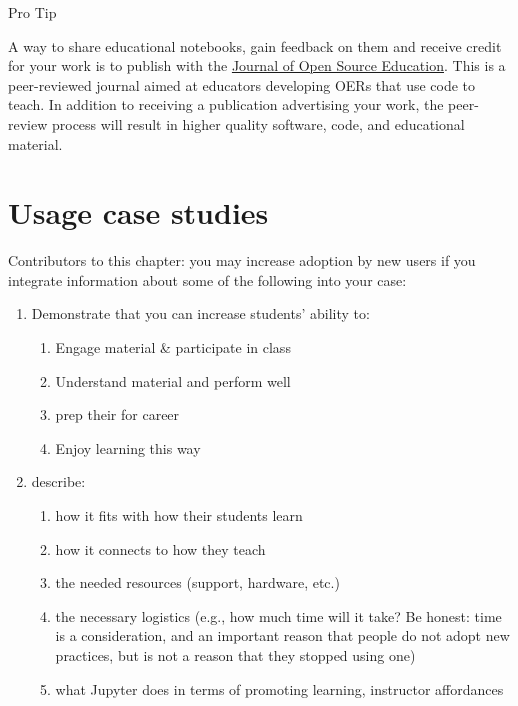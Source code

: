\documentclass[]{book}
\providecommand{\tightlist}{%
  \setlength{\itemsep}{0pt}\setlength{\parskip}{0pt}}
\let\BeginKnitrBlock\begin \let\EndKnitrBlock\end
\begin{document}
\BeginKnitrBlock{rmdnote}
Pro Tip

A way to share educational notebooks, gain feedback on them and receive
credit for your work is to publish with the
\href{http://jose.theoj.org}{Journal of Open Source Education}. This is a
peer-reviewed journal aimed at educators developing OERs that use code to
teach. In addition to receiving a publication advertising your work, the
peer-review process will result in higher quality software, code, and
educational material.
\EndKnitrBlock{rmdnote}

\hypertarget{case-studies}{%
\chapter{Usage case studies}\label{case-studies}}

Contributors to this chapter: you may increase adoption by new users
if you integrate information about some of the following into your
case:

\begin{enumerate}
\def\labelenumi{\arabic{enumi}.}
\tightlist
\item
  Demonstrate that you can increase students' ability to:

  \begin{enumerate}
  \def\labelenumii{\arabic{enumii}.}
  \tightlist
  \item
    Engage material \& participate in class
  \item
    Understand material and perform well
  \item
    prep their for career
  \item
    Enjoy learning this way
  \end{enumerate}
\item
  describe:

  \begin{enumerate}
  \def\labelenumii{\arabic{enumii}.}
  \tightlist
  \item
    how it fits with how their students learn
  \item
    how it connects to how they teach
  \item
    the needed resources (support, hardware, etc.)
  \item
    the necessary logistics (e.g., how much time will it take? Be honest:
    time is a consideration, and an important reason that people do not
    adopt new practices, but is not a reason that they stopped using one)
  \item
    what Jupyter does in terms of promoting learning, instructor
    affordances
  \end{enumerate}
\end{enumerate}
\end{document}
